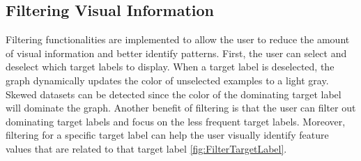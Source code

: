 \subsection{Filtering Visual Information}
Filtering functionalities are implemented to allow the user to reduce the amount of visual information and better identify patterns. First, the user can select and deselect which target labels to display. When a target label is deselected, the graph dynamically updates the color of unselected examples to a light gray. Skewed datasets can be detected since the color of the dominating target label will dominate the graph. Another benefit of filtering is that the user can filter out dominating target labels and focus on the less frequent target labels. Moreover, filtering for a specific target label can help the user visually identify feature values that are related to that target label \ref{fig:FilterTargetLabel}.

